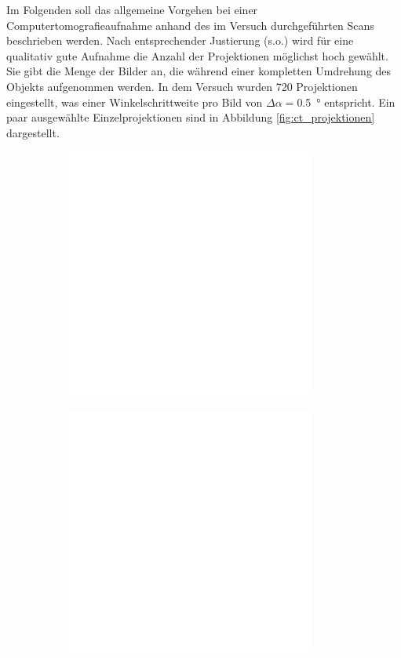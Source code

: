 \documentclass[11pt, a4paper]{article}
\numberwithin{equation}{section}
\begin{document}
Im Folgenden soll das allgemeine Vorgehen bei einer Computertomografieaufnahme anhand des im Versuch durchgeführten Scans beschrieben werden.
Nach entsprechender Justierung (s.o.) wird für eine qualitativ gute Aufnahme die Anzahl der Projektionen möglichst hoch gewählt.
Sie gibt die Menge der Bilder an, die während einer kompletten Umdrehung des Objekts aufgenommen werden.
In dem Versuch wurden \num{720} Projektionen eingestellt, was einer Winkelschrittweite pro Bild von $\Delta\alpha=$\SI{0.5}{\degree} entspricht.
Ein paar ausgewählte Einzelprojektionen sind in Abbildung \ref{fig:ct_projektionen} dargestellt.
\begin{figure}[ht]
	\begin{subfigure}[c]{0.5\textwidth}
		\centering
		\includegraphics[width=0.9\textwidth]{./figures/ct/Projection2_5.png}
	\end{subfigure}
	\begin{subfigure}[c]{0.5\textwidth}
		\centering
		\includegraphics[width=0.9\textwidth]{./figures/ct/Projection264.png}

\end{subfigure}
\end{figure}
\end{document}
